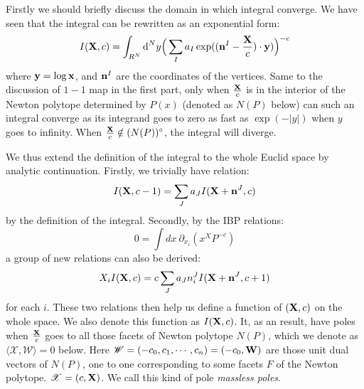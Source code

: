 \documentclass[12pt]{article}
\theoremstyle{definition}
\theoremstyle{plain}
\begin{document}
Firstly we should briefly discuss the domain in which integral converge. We have seen that the integral can be rewritten as an exponential form:
\begin{equation}
I({\bf X},c)=\int_{R^N}{\text d}^N y\Big(\sum_Ia_I \exp(({\bf n}^I-\frac{{\bf X}}c)\cdot {\bf y})\Big)^{-c}
\end{equation}
where ${\bf y}=\log {\bf x}$, and ${\bf n}^I$ are the coordinates of the vertices. Same to the discussion of $1-1$ map in the first part, only when $\frac{{\bf X}}c$ is in the interior of the Newton polytope determined by $P(x)$ (denoted as $N(P)$ below) can such an integral converge as its integrand goes to zero as fast as $\exp(-|y|)$ when $y$ goes to infinity. When $\frac{{\bf X}}c\notin (N(P))^\circ$, the integral will diverge.

We thus extend the definition of the integral to the whole Euclid space by analytic continuation. Firstly, we trivially have relation:
\begin{equation}\label{tiv}
I({\bf X},c-1)=\sum_J a_J I({\bf X+n}^J,c)
\end{equation} 
by the definition of the integral. Secondly, by the IBP relations:
\begin{equation}
0=\int dx\  \partial_{x_i}(x^X P^{-c})
\end{equation}
a group of new relations can also be derived:
\begin{equation}\label{IBP}
X_iI({\bf X},c)=c\sum_J a_J n^J_i I({\bf X+n}^J,c+1)
\end{equation}
for each $i$. These two relations then help us define a function of $({\bf X},c)$ on the whole space. We also denote this function as $I({\bf X},c)$.  It, as an result, have poles when $\frac{{\bf X}}c$ goes to all those facets of Newton polytope $N(P)$, which we denote as $\langle {\mathscr X}, {\mathscr W}\rangle=0$ below. Here ${\mathscr W}=(-c_0,c_1,\cdots,c_n)=(-c_0,{\bf W})$ are those unit dual vectors of $N(P)$, one to one corresponding to some facets $F$ of the Newton polytope. ${\mathscr X}=(c,{\bf X})$. We call this kind of pole {\it massless poles}. 
\end{document}
